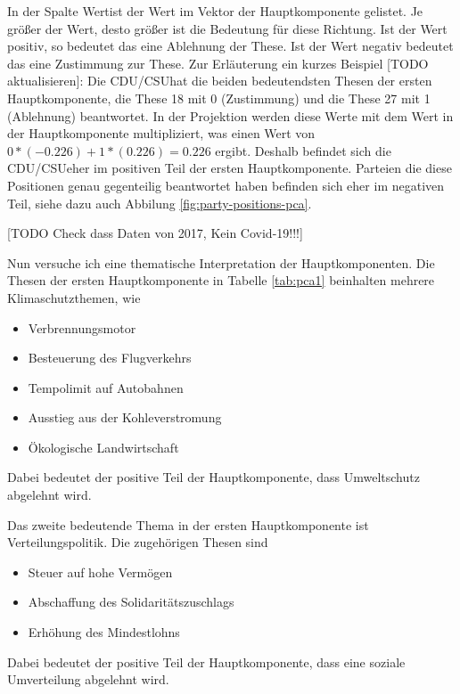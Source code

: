 In der Spalte \glqq Wert\grqq ist der Wert im Vektor der Hauptkomponente gelistet. Je größer der Wert, desto größer ist die Bedeutung für diese Richtung. Ist der Wert positiv, so bedeutet das eine Ablehnung der These. Ist der Wert negativ bedeutet das eine Zustimmung zur These.
Zur Erläuterung ein kurzes Beispiel [TODO aktualisieren]: Die \glqq CDU/CSU\grqq hat die beiden bedeutendsten Thesen der ersten Hauptkomponente, die These 18 mit 0 (Zustimmung) und die These 27 mit 1 (Ablehnung) beantwortet. In der Projektion werden diese Werte mit dem Wert in der Hauptkomponente multipliziert, was einen Wert von $0*(-0.226)+1*(0.226)=0.226$ ergibt. Deshalb befindet sich die \glqq CDU/CSU\grqq eher im positiven Teil der ersten Hauptkomponente. Parteien die diese Positionen genau gegenteilig beantwortet haben befinden sich eher im negativen Teil, siehe dazu auch Abbilung \ref{fig:party-positions-pca}.

\begin{table}%
	\centering
	\caption{TODO caption}
	\label{tab:pca2}
\end{table}
[TODO Check dass Daten von 2017, Kein Covid-19!!!]

Nun versuche ich eine thematische Interpretation der Hauptkomponenten. Die Thesen der ersten Hauptkomponente in Tabelle \ref{tab:pca1} beinhalten mehrere Klimaschutzthemen, wie
\begin{itemize}
	\item Verbrennungsmotor
	\item Besteuerung des Flugverkehrs
	\item Tempolimit auf Autobahnen
	\item Ausstieg aus der Kohleverstromung
	\item Ökologische Landwirtschaft
\end{itemize}
Dabei bedeutet der positive Teil der Hauptkomponente, dass Umweltschutz abgelehnt wird.

Das zweite bedeutende Thema in der ersten Hauptkomponente ist Verteilungspolitik. Die zugehörigen Thesen sind
\begin{itemize}
	\item Steuer auf hohe Vermögen
	\item Abschaffung des Solidaritätszuschlags
	\item Erhöhung des Mindestlohns
\end{itemize}
Dabei bedeutet der positive Teil der Hauptkomponente, dass eine soziale Umverteilung abgelehnt wird.

